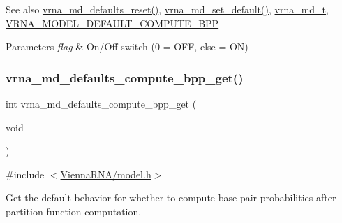 \begin{DoxySeeAlso}{See also}
\mbox{\hyperlink{group__model__details_ga70834424cf804d149937de89f80ceb45}{vrna\+\_\+md\+\_\+defaults\+\_\+reset()}}, \mbox{\hyperlink{group__model__details_ga8ac6ff84936282436f822644bf841f66}{vrna\+\_\+md\+\_\+set\+\_\+default()}}, \mbox{\hyperlink{group__model__details_ga1f8a10e12a0a1915f2a4eff0b28ea17c}{vrna\+\_\+md\+\_\+t}}, \mbox{\hyperlink{group__model__details_ga1d6cd5051940b126c248147c011bac6c}{V\+R\+N\+A\+\_\+\+M\+O\+D\+E\+L\+\_\+\+D\+E\+F\+A\+U\+L\+T\+\_\+\+C\+O\+M\+P\+U\+T\+E\+\_\+\+B\+PP}} 
\end{DoxySeeAlso}

\begin{DoxyParams}{Parameters}
{\em flag} & On/\+Off switch (0 = O\+FF, else = ON) \\
\hline
\end{DoxyParams}
\mbox{\label{group__model__details_gaa3a537e61fbe0518673bf9f73fd820f3}} 
\subsubsection{\texorpdfstring{vrna\_md\_defaults\_compute\_bpp\_get()}{vrna\_md\_defaults\_compute\_bpp\_get()}}
{\footnotesize\ttfamily int vrna\+\_\+md\+\_\+defaults\+\_\+compute\+\_\+bpp\+\_\+get (\begin{DoxyParamCaption}\item[{void}]{ }\end{DoxyParamCaption})}



{\ttfamily \#include $<$\mbox{\hyperlink{model_8h}{Vienna\+R\+N\+A/model.\+h}}$>$}



Get the default behavior for whether to compute base pair probabilities after partition function computation. 

